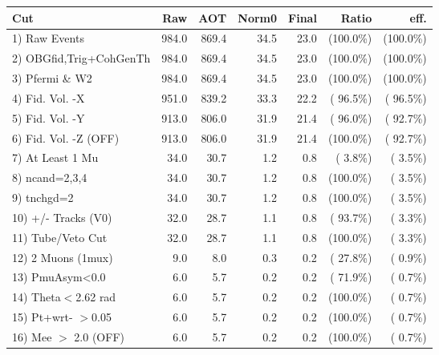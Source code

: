  \begin{table}[h!]\centering
 \begin{tabular}{||l||r|r|r|r|r|r||}
 \hline
 \hline
 Cut & Raw & AOT & Norm0 & Final & Ratio & eff.       \\
 \hline
  1) Raw Events           &        984.0 &        869.4 &         34.5 &         23.0 & (100.0\%) & (100.0\%) \\
  2) OBGfid,Trig+CohGenTh &        984.0 &        869.4 &         34.5 &         23.0 & (100.0\%) & (100.0\%) \\
  3) Pfermi \& W2         &        984.0 &        869.4 &         34.5 &         23.0 & (100.0\%) & (100.0\%) \\
  4) Fid. Vol. -X         &        951.0 &        839.2 &         33.3 &         22.2 & ( 96.5\%) & ( 96.5\%) \\
  5) Fid. Vol. -Y         &        913.0 &        806.0 &         31.9 &         21.4 & ( 96.0\%) & ( 92.7\%) \\
  6) Fid. Vol. -Z (OFF)   &        913.0 &        806.0 &         31.9 &         21.4 & (100.0\%) & ( 92.7\%) \\
  7) At Least 1 Mu        &         34.0 &         30.7 &          1.2 &          0.8 & (  3.8\%) & (  3.5\%) \\
  8) ncand=2,3,4          &         34.0 &         30.7 &          1.2 &          0.8 & (100.0\%) & (  3.5\%) \\
  9) tnchgd=2             &         34.0 &         30.7 &          1.2 &          0.8 & (100.0\%) & (  3.5\%) \\
 10) +/- Tracks (V0)      &         32.0 &         28.7 &          1.1 &          0.8 & ( 93.7\%) & (  3.3\%) \\
 11) Tube/Veto Cut        &         32.0 &         28.7 &          1.1 &          0.8 & (100.0\%) & (  3.3\%) \\
 12) 2 Muons (1mux)       &          9.0 &          8.0 &          0.3 &          0.2 & ( 27.8\%) & (  0.9\%) \\
 13) PmuAsym<0.0          &          6.0 &          5.7 &          0.2 &          0.2 & ( 71.9\%) & (  0.7\%) \\
 14) Theta$<$2.62 rad     &          6.0 &          5.7 &          0.2 &          0.2 & (100.0\%) & (  0.7\%) \\
 15) Pt+wrt- $>$0.05      &          6.0 &          5.7 &          0.2 &          0.2 & (100.0\%) & (  0.7\%) \\
 16) Mee $>$ 2.0  (OFF)   &          6.0 &          5.7 &          0.2 &          0.2 & (100.0\%) & (  0.7\%) \\

\end{tabular}
\end{table}
